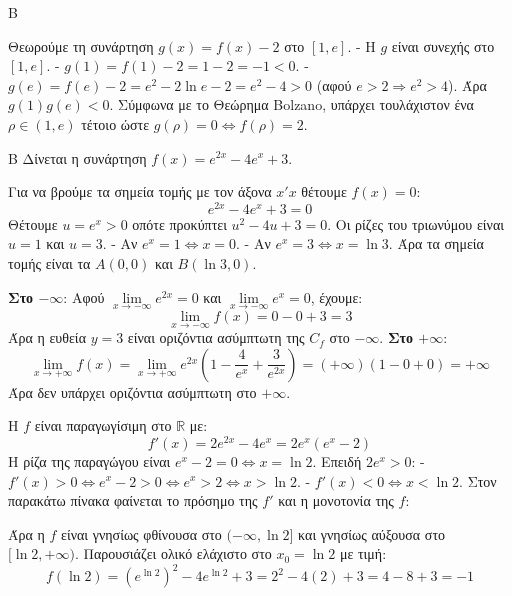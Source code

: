 \begin{thema}{Β}
\begin{erwthma}
\item Θεωρούμε τη συνάρτηση $g(x) = f(x) - 2$ στο $[1, e]$.
- Η $g$ είναι συνεχής στο $[1, e]$.
- $g(1) = f(1) - 2 = 1 - 2 = -1 < 0$.
- $g(e) = f(e) - 2 = e^2 - 2\ln e - 2 = e^2 - 4 > 0$ (αφού $e > 2 \Rightarrow e^2 > 4$).
Άρα $g(1)g(e) < 0$.
Σύμφωνα με το Θεώρημα Bolzano, υπάρχει τουλάχιστον ένα $\rho \in (1, e)$ τέτοιο ώστε $g(\rho) = 0 \Leftrightarrow f(\rho) = 2$.
\end{erwthma}
\end{thema}

\begin{thema}{Β}
Δίνεται η συνάρτηση $f(x) = e^{2x} - 4e^x + 3$.

\begin{erwthma}
\item Για να βρούμε τα σημεία τομής με τον άξονα $x'x$ θέτουμε $f(x) = 0$:
\[ e^{2x} - 4e^x + 3 = 0 \]
Θέτουμε $u = e^x > 0$ οπότε προκύπτει $u^2 - 4u + 3 = 0$. Οι ρίζες του τριωνύμου είναι $u=1$ και $u=3$.
- Αν $e^x = 1 \Leftrightarrow x = 0$.
- Αν $e^x = 3 \Leftrightarrow x = \ln 3$.
Άρα τα σημεία τομής είναι τα $A(0, 0)$ και $B(\ln 3, 0)$.

\item \textbf{Στο $-\infty$}:
Αφού $\lim\limits_{x\to-\infty} e^{2x} = 0$ και $\lim\limits_{x\to-\infty} e^x = 0$, έχουμε:
\[ \lim_{x\to-\infty} f(x) = 0 - 0 + 3 = 3 \]
Άρα η ευθεία $y = 3$ είναι οριζόντια ασύμπτωτη της $C_f$ στο $-\infty$.
\textbf{Στο $+\infty$}:
\[ \lim_{x\to+\infty} f(x) = \lim_{x\to+\infty} e^{2x}\left(1 - \frac{4}{e^x} + \frac{3}{e^{2x}}\right) = (+\infty)(1 - 0 + 0) = +\infty \]
Άρα δεν υπάρχει οριζόντια ασύμπτωτη στο $+\infty$.

\item Η $f$ είναι παραγωγίσιμη στο $\mathbb{R}$ με:
\[ f'(x) = 2e^{2x} - 4e^x = 2e^x(e^x - 2) \]
Η ρίζα της παραγώγου είναι $e^x - 2 = 0 \Leftrightarrow x = \ln 2$.
Επειδή $2e^x > 0$:
- $f'(x) > 0 \Leftrightarrow e^x - 2 > 0 \Leftrightarrow e^x > 2 \Leftrightarrow x > \ln 2$.
- $f'(x) < 0 \Leftrightarrow x < \ln 2$.
Στον παρακάτω πίνακα φαίνεται το πρόσημο της $f'$ και η μονοτονία της $f$:
\begin{center}
\end{center}
Άρα η $f$ είναι γνησίως φθίνουσα στο $(-\infty, \ln 2]$ και γνησίως αύξουσα στο $[\ln 2, +\infty)$.
Παρουσιάζει ολικό ελάχιστο στο $x_0 = \ln 2$ με τιμή:
\[ f(\ln 2) = (e^{\ln 2})^2 - 4e^{\ln 2} + 3 = 2^2 - 4(2) + 3 = 4 - 8 + 3 = -1 \]


\end{erwthma}
\end{thema}
